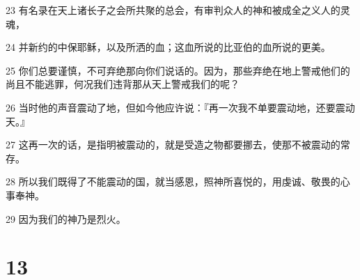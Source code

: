 \par 23 有名录在天上诸长子之会所共聚的总会，有审判众人的神和被成全之义人的灵魂，
\par 24 并新约的中保耶稣，以及所洒的血；这血所说的比亚伯的血所说的更美。
\par 25 你们总要谨慎，不可弃绝那向你们说话的。因为，那些弃绝在地上警戒他们的尚且不能逃罪，何况我们违背那从天上警戒我们的呢？
\par 26 当时他的声音震动了地，但如今他应许说：『再一次我不单要震动地，还要震动天。』
\par 27 这再一次的话，是指明被震动的，就是受造之物都要挪去，使那不被震动的常存。
\par 28 所以我们既得了不能震动的国，就当感恩，照神所喜悦的，用虔诚、敬畏的心事奉神。
\par 29 因为我们的神乃是烈火。

\chapter{13}

